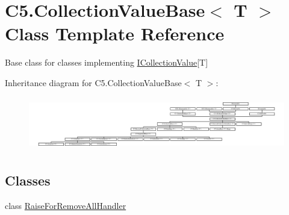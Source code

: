 \hypertarget{class_c5_1_1_collection_value_base}{}\section{C5.\+Collection\+Value\+Base$<$ T $>$ Class Template Reference}
\label{class_c5_1_1_collection_value_base}


Base class for classes implementing \hyperlink{interface_c5_1_1_i_collection_value}{I\+Collection\+Value}\mbox{[}T\mbox{]}  


Inheritance diagram for C5.\+Collection\+Value\+Base$<$ T $>$\+:\begin{figure}[H]
\begin{center}
\leavevmode
\includegraphics[height=2.372881cm]{class_c5_1_1_collection_value_base}
\end{center}
\end{figure}
\subsection*{Classes}
\begin{DoxyCompactItemize}
\item 
class \hyperlink{class_c5_1_1_collection_value_base_1_1_raise_for_remove_all_handler}{Raise\+For\+Remove\+All\+Handler}
\end{DoxyCompactItemize}
